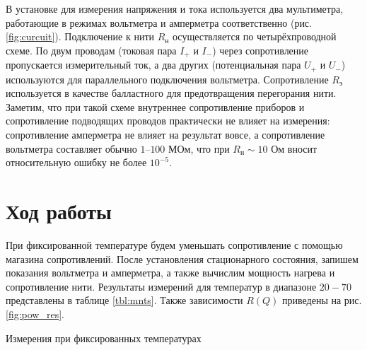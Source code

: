 \documentclass[a4paper,12pt]{article}
\begin{document}
  В установке для измерения напряжения и тока используется два мультиметра, работающие в режимах вольтметра и амперметра соответственно (рис. \ref{fig:curcuit}). Подключение к нити $R_н$ осуществляется по четырёхпроводной схеме. По двум проводам (токовая пара $I_{+}$ и $I_{-}$) через сопротивление пропускается измерительный ток, а два других (потенциальная пара $U_{+}$ и $U_{-}$) используются для параллельного подключения вольтметра. Сопротивление $R_э$ используется в качестве балластного для предотвращения перегорания нити. Заметим, что при такой схеме внутреннее сопротивление приборов и сопротивление подводящих проводов практически не влияет на измерения: сопротивление амперметра не влияет на результат вовсе, а сопротивление вольтметра составляет обычно $1–100$ МОм, что при $R_н \sim 10$ Ом вносит относительную ошибку не более $10^{-5}$.

\section{Ход работы}

  При фиксированной температуре будем уменьшать сопротивление с помощью магазина сопротивлений. После установления стационарного состояния, запишем показания вольтметра и амперметра, а также вычислим мощность нагрева и сопротивление нити. Результаты измерений для температур в диапазоне $20-70$ \textcelsius{} представлены в таблице \ref{tbl:mnts}. Также зависимости $R(Q)$ приведены на рис. \ref{fig:pow_res}.

  \begin{table}[!htb]
  \begin{minipage}{0.5\textwidth}
    \centering
    

    \vspace*{5mm}
    
  \end{minipage}
  \hspace{5mm}
  \begin{minipage}{0.5\textwidth}
    \centering
    

    \vspace*{5mm}
    
  \end{minipage}

  \end{table}

  \begin{table}[ht!]
    \centering
    
    \caption{Измерения при фиксированных температурах}
    \label{tbl:mnts}
  \end{table}
\end{document}

